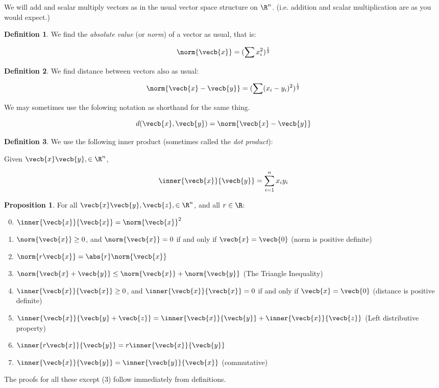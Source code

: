 \documentclass[a5paper]{article}
\theoremstyle{definition}%
\newtheorem{proposition}[theorem]{Proposition}
\newtheorem*{definition*}{Definition}
\numberwithin{exercise}{section}
\theoremstyle{remark}%
\begin{document}
We will add and scalar multiply vectors as in the usual vector space structure on $\R^n$. (i.e. addition and scalar multiplication are as you would expect.)

\begin{definition*}
We find the \emph{absolute value}  (or \emph{norm}) of a vector as usual, that is:

$$\norm{\vecb{x}}=(\sum x_i^2)^{\frac{1}{2}}$$
\end{definition*}

\begin{definition*}
We find distance between vectors also as usual:

$$\norm{\vecb{x}-\vecb{y}}=(\sum(x_i-y_i)^2)^{\frac{1}{2}}$$

We may sometimes use the folowing notation as shorthand for the same thing. 

$$d(\vecb{x},\vecb{y})=\norm{\vecb{x}-\vecb{y}}$$
\end{definition*}

\begin{definition*}
We use the following inner product (sometimes called the \emph{dot product}):

Given $\vecb{x} \vecb{y}, \in \R^n$, 

$$\inner{\vecb{x}} {\vecb{y}}=\sum_{i=1}^n x_i y_i$$

\end{definition*}

\pagebreak
\begin{proposition}
For all $\vecb{x} \vecb{y}, \vecb{z}, \in \R^n$, and all $r \in \R$:

\begin{enumerate}
\setcounter{enumi}{-1}
\item $\inner{\vecb{x}}{\vecb{x}}=\norm{\vecb{x}}^2$
\item $\norm{\vecb{x}}\geq0$, and $\norm{\vecb{x}}=0$ if and only if $\vecb{x}=\vecb{0}$ (norm is positive definite)
\item $\norm{r\vecb{x}}=\abs{r}\norm{\vecb{x}}$
\item \quad \begin{highlight}
$\norm{\vecb{x}+\vecb{y}}\leq\norm{\vecb{x}}+\norm{\vecb{y}}$ (The Triangle Inequality)
\end{highlight}
\item $\inner{\vecb{x}}{\vecb{x}} \geq 0$, and $\inner{\vecb{x}}{\vecb{x}}=0$  if and only if $\vecb{x}=\vecb{0}$ (distance is positive definite)
\item $\inner{\vecb{x}}{\vecb{y}+\vecb{z}}=\inner{\vecb{x}}{\vecb{y}}+\inner{\vecb{x}}{\vecb{z}}$ (Left distributive property)
\item $\inner{r\vecb{x}}{\vecb{y}}=r\inner{\vecb{x}}{\vecb{y}}$
\item $\inner{\vecb{x}}{\vecb{y}}=\inner{\vecb{y}}{\vecb{x}}$ (commutative)
\end{enumerate}
The proofs for all these except (3) follow immediately from definitions. 
\end{proposition}
\end{document}
